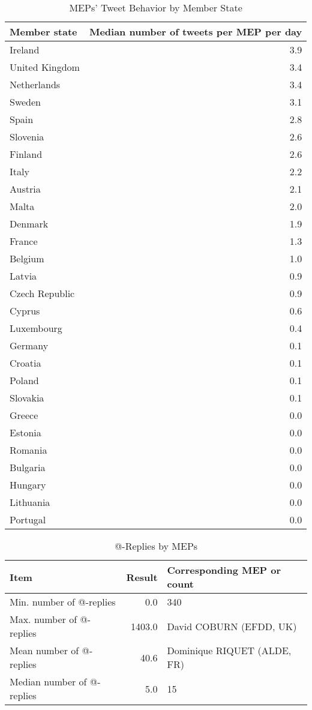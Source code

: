 \documentclass[12pt]{article}\usepackage[]{graphicx}\usepackage[]{color}
\begin{document}
\begin{table}[H]
\centering
\caption{MEPs' Tweet Behavior by Member State} 
\begin{tabular}{lr}
  \hline
Member state & Median number of tweets per MEP per day \\ 
  \hline
Ireland & 3.9 \\ 
  United Kingdom & 3.4 \\ 
  Netherlands & 3.4 \\ 
  Sweden & 3.1 \\ 
  Spain & 2.8 \\ 
  Slovenia & 2.6 \\ 
  Finland & 2.6 \\ 
  Italy & 2.2 \\ 
  Austria & 2.1 \\ 
  Malta & 2.0 \\ 
  Denmark & 1.9 \\ 
  France & 1.3 \\ 
  Belgium & 1.0 \\ 
  Latvia & 0.9 \\ 
  Czech Republic & 0.9 \\ 
  Cyprus & 0.6 \\ 
  Luxembourg & 0.4 \\ 
  Germany & 0.1 \\ 
  Croatia & 0.1 \\ 
  Poland & 0.1 \\ 
  Slovakia & 0.1 \\ 
  Greece & 0.0 \\ 
  Estonia & 0.0 \\ 
  Romania & 0.0 \\ 
  Bulgaria & 0.0 \\ 
  Hungary & 0.0 \\ 
  Lithuania & 0.0 \\ 
  Portugal & 0.0 \\ 
   \hline
\end{tabular}
\end{table}



\begin{table}[H]
\centering
\caption{@-Replies by MEPs} 
\begin{tabular}{lrl}
  \hline
Item & Result & Corresponding MEP or count \\ 
  \hline
Min. number of @-replies & 0.0 & 340 \\ 
  Max. number of @-replies & 1403.0 & David COBURN (EFDD, UK) \\ 
  Mean number of @-replies & 40.6 & Dominique RIQUET (ALDE, FR) \\ 
  Median number of @-replies & 5.0 & 15 \\ 
   \hline
\end{tabular}
\end{table}
\end{document}
